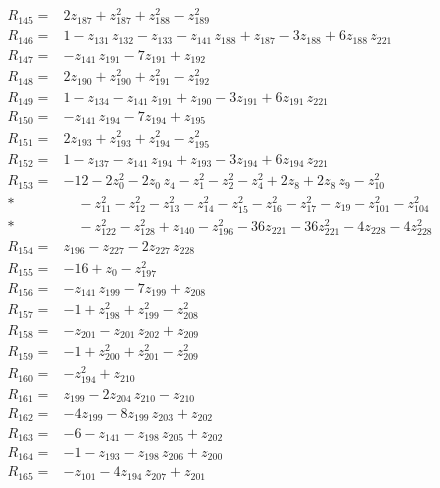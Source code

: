 \documentclass[11pt]{article}
\theoremstyle{remark}\newtheorem{remark}[theorem]{Remark}
\begin{document}
\begin{align*}
R_{145}={}& 2z_{187} + z_{187}^{2} + z_{188}^{2} - z_{189}^{2} \\[2pt]
R_{146}={}& 1 - z_{131}\,z_{132} - z_{133} - z_{141}\,z_{188} + z_{187} - 3z_{188} + 6z_{188}\,z_{221} \\[2pt]
R_{147}={}& -z_{141}\,z_{191} - 7z_{191} + z_{192} \\[2pt]
R_{148}={}& 2z_{190} + z_{190}^{2} + z_{191}^{2} - z_{192}^{2} \\[2pt]
R_{149}={}& 1 - z_{134} - z_{141}\,z_{191} + z_{190} - 3z_{191} + 6z_{191}\,z_{221} \\[2pt]
R_{150}={}& -z_{141}\,z_{194} - 7z_{194} + z_{195} \\[2pt]
R_{151}={}& 2z_{193} + z_{193}^{2} + z_{194}^{2} - z_{195}^{2} \\[2pt]
R_{152}={}& 1 - z_{137} - z_{141}\,z_{194} + z_{193} - 3z_{194} + 6z_{194}\,z_{221} \\[2pt]
R_{153}={}& -12 - 2z_{0}^{2} - 2z_{0}\,z_{4} - z_{1}^{2} - z_{2}^{2} - z_{4}^{2} + 2z_{8} + 2z_{8}\,z_{9} - z_{10}^{2} \\*
&\quad  - z_{11}^{2} - z_{12}^{2} - z_{13}^{2} - z_{14}^{2} - z_{15}^{2} - z_{16}^{2} - z_{17}^{2} - z_{19} - z_{101}^{2} - z_{104}^{2} \\*
&\quad  - z_{122}^{2} - z_{128}^{2} + z_{140} - z_{196}^{2} - 36z_{221} - 36z_{221}^{2} - 4z_{228} - 4z_{228}^{2} \\[2pt]
R_{154}={}& z_{196} - z_{227} - 2z_{227}\,z_{228} \\[2pt]
R_{155}={}& -16 + z_{0} - z_{197}^{2} \\[2pt]
R_{156}={}& -z_{141}\,z_{199} - 7z_{199} + z_{208} \\[2pt]
R_{157}={}& -1 + z_{198}^{2} + z_{199}^{2} - z_{208}^{2} \\[2pt]
R_{158}={}& -z_{201} - z_{201}\,z_{202} + z_{209} \\[2pt]
R_{159}={}& -1 + z_{200}^{2} + z_{201}^{2} - z_{209}^{2} \\[2pt]
R_{160}={}& -z_{194}^{2} + z_{210} \\[2pt]
R_{161}={}& z_{199} - 2z_{204}\,z_{210} - z_{210} \\[2pt]
R_{162}={}& -4z_{199} - 8z_{199}\,z_{203} + z_{202} \\[2pt]
R_{163}={}& -6 - z_{141} - z_{198}\,z_{205} + z_{202} \\[2pt]
R_{164}={}& -1 - z_{193} - z_{198}\,z_{206} + z_{200} \\[2pt]
R_{165}={}& -z_{101} - 4z_{194}\,z_{207} + z_{201} \\[2pt]

\end{align*}
\end{document}
